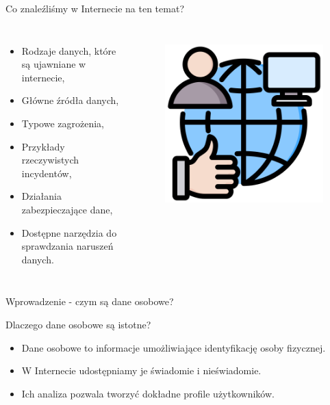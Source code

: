 \begin{frame}{Co znaleźliśmy w Internecie na ten temat?}
  \begin{columns}[c]
    \begin{itemize}
      \item Rodzaje danych, które są ujawniane w internecie,
      \item Główne źródła danych,
      \item Typowe zagrożenia,
      \item Przykłady rzeczywistych incydentów,
      \item Działania zabezpieczające dane,
      \item Dostępne narzędzia do sprawdzania naruszeń danych.
    \end{itemize}
    \begin{figure}
      \centering
      \includegraphics[height=0.45\textheight]{images/social-network.png}
      \label{fig:dnaCase}
    \end{figure}
\end{columns}
\end{frame}

\begin{frame}{Wprowadzenie - czym są dane osobowe?}
    \begin{alertblock}{Dlaczego dane osobowe są istotne?}
      \begin{itemize}
        \item Dane osobowe to informacje umożliwiające identyfikację osoby fizycznej.\cite{PII_USDE}
        \item W Internecie udostępniamy je świadomie i nieświadomie.
        \item Ich analiza pozwala tworzyć dokładne profile użytkowników.
      \end{itemize}
    \end{alertblock}
  \end{frame}
  
